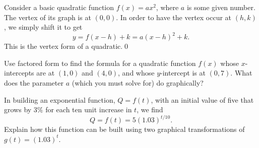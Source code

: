 \begin{eg} Consider a basic quadratic function $f(x) = ax^2$, where $a$ is some given number. The vertex of its graph is at $(0,0)$. In order to have the vertex occur at $(h,k)$, we simply shift it to get
\[
 y = f(x-h)+k = a(x-h)^2 + k.
\]
This is the vertex form of a quadratic.\qed \end{eg}

\par

\begin{question} Use factored form to find the formula for a quadratic function $f(x)$ whose $x$-intercepts are at $(1,0)$ and $(4,0)$, and whose $y$-intercept is at $(0,7)$. What does the parameter $a$ (which you must solve for) do graphically?
\end{question}


\begin{question} In building an exponential function, $Q = f(t)$, with an initial value of five that grows by $3\%$ for each ten unit increase in $t$, we find
\[
Q = f(t) = 5(1.03)^{t/10}.
\]
Explain how this function can be built using two graphical transformations of $g(t) = (1.03)^t$.
\end{question} 

\vfill  
